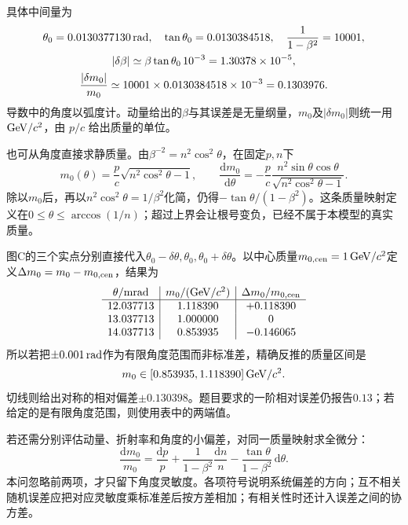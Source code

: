 \documentclass[UTF8,fontset=fandol,a4paper,11pt]{ctexart}
\begin{document}
具体中间量为
\[
\begin{gathered}
\theta_0=0.0130377130\,{\rm rad},\quad
\tan\theta_0=0.0130384518,\quad
\frac1{1-\beta^2}=10001,\\
|\delta\beta|\simeq\beta\tan\theta_0\,10^{-3}
=1.30378\times10^{-5},\\
\frac{|\delta m_0|}{m_0}\simeq
10001\times0.0130384518\times10^{-3}=0.1303976 .
\end{gathered}
\]
导数中的角度以弧度计。动量给出的$\beta$与其误差是无量纲量，$m_0$及$|\delta m_0|$则统一用$ {\rm GeV}/c^2$，由 $p/c$ 给出质量的单位。

也可从角度直接求静质量。由$\beta^{-2}=n^2\cos^2\theta$，在固定$p,n$下
\[
m_0(\theta)=\frac pc\sqrt{n^2\cos^2\theta-1},\qquad
\frac{\mathrm dm_0}{\mathrm d\theta}
=-\frac pc\frac{n^2\sin\theta\cos\theta}
 {\sqrt{n^2\cos^2\theta-1}}.
\]
除以$m_0$后，再以$n^2\cos^2\theta=1/\beta^2$化简，仍得$-\tan\theta/(1-\beta^2)$。这条质量映射定义在$0\le\theta\le\arccos(1/n)$；超过上界会让根号变负，已经不属于本模型的真实质量。

图C的三个实点分别直接代入$\theta_0-\delta\theta,\theta_0,\theta_0+\delta\theta$。以中心质量$m_{0,\rm cen}=1\,{\rm GeV}/c^2$定义$\Delta m_0=m_0-m_{0,\rm cen}$，结果为
\[
\begin{array}{c|c|c}
\theta/ {\rm mrad}&m_0/({\rm GeV}/c^2)&\Delta m_0/m_{0,\rm cen}\\ \hline
12.037713&1.118390&+0.118390\\
13.037713&1.000000&0\\
14.037713&0.853935&-0.146065
\end{array}
\]
所以若把$\pm0.001\,{\rm rad}$作为有限角度范围而非标准差，精确反推的质量区间是
\[
m_0\in[0.853935,1.118390]\,{\rm GeV}/c^2 .
\]
切线则给出对称的相对偏差$\pm0.130398$。题目要求的一阶相对误差仍报告$0.13$；若给定的是有限角度范围，则使用表中的两端值。

若还需分别评估动量、折射率和角度的小偏差，对同一质量映射求全微分：
\[
\frac{\mathrm dm_0}{m_0}
=\frac{\mathrm dp}{p}
+\frac1{1-\beta^2}\frac{\mathrm dn}{n}
-\frac{\tan\theta}{1-\beta^2}\,\mathrm d\theta .
\]
本问忽略前两项，才只留下角度灵敏度。各项符号说明系统偏差的方向；互不相关随机误差应把对应灵敏度乘标准差后按方差相加；有相关性时还计入误差之间的协方差。
\end{document}
